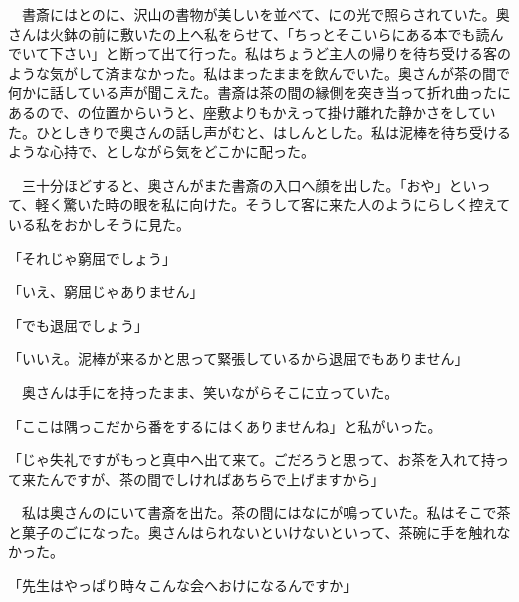 \documentclass[a4j,onecolumn]{tarticle}
\begin{document}
　書斎にはとのに、\hbox{}沢山の書物が美しいを並べて、\hbox{}にの光で照らされていた。\hbox{}奥さんは火鉢の前に敷いたの上へ私をらせて、\hbox{}「ちっとそこいらにある本でも読んでいて下さい」と断って出て行った。\hbox{}私はちょうど主人の帰りを待ち受ける客のような気がして済まなかった。\hbox{}私はまったままを飲んでいた。\hbox{}奥さんが茶の間で何かに話している声が聞こえた。\hbox{}書斎は茶の間の縁側を突き当って折れ曲ったにあるので、\hbox{}の位置からいうと、\hbox{}座敷よりもかえって掛け離れた静かさをしていた。\hbox{}ひとしきりで奥さんの話し声がむと、\hbox{}はしんとした。\hbox{}私は泥棒を待ち受けるような心持で、\hbox{}としながら気をどこかに配った。\hbox{}\par{}
　三十分ほどすると、\hbox{}奥さんがまた書斎の入口へ顔を出した。\hbox{}「おや」といって、\hbox{}軽く驚いた時の眼を私に向けた。\hbox{}そうして客に来た人のようにらしく控えている私をおかしそうに見た。\hbox{}\par{}
「それじゃ窮屈でしょう」\par{}
「いえ、\hbox{}窮屈じゃありません」\par{}
「でも退屈でしょう」\par{}
「いいえ。\hbox{}泥棒が来るかと思って緊張しているから退屈でもありません」\par{}
　奥さんは手にを持ったまま、\hbox{}笑いながらそこに立っていた。\hbox{}\par{}
「ここは隅っこだから番をするにはくありませんね」と私がいった。\hbox{}\par{}
「じゃ失礼ですがもっと真中へ出て来て。\hbox{}ごだろうと思って、\hbox{}お茶を入れて持って来たんですが、\hbox{}茶の間でしければあちらで上げますから」\par{}
　私は奥さんのにいて書斎を出た。\hbox{}茶の間にはなにが鳴っていた。\hbox{}私はそこで茶と菓子のごになった。\hbox{}奥さんはられないといけないといって、\hbox{}茶碗に手を触れなかった。\hbox{}\par{}
「先生はやっぱり時々こんな会へおけになるんですか」\par{}
\end{document}
